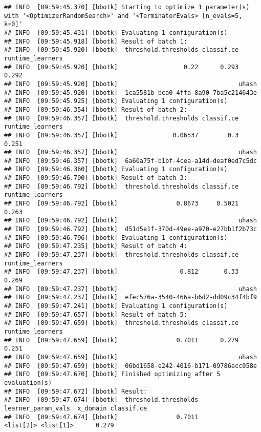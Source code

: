 \documentclass[
]{scrbook}
\begin{document}
\begin{verbatim}
## INFO  [09:59:45.370] [bbotk] Starting to optimize 1 parameter(s) with '<OptimizerRandomSearch>' and '<TerminatorEvals> [n_evals=5, k=0]' 
## INFO  [09:59:45.431] [bbotk] Evaluating 1 configuration(s) 
## INFO  [09:59:45.918] [bbotk] Result of batch 1: 
## INFO  [09:59:45.920] [bbotk]  threshold.thresholds classif.ce runtime_learners 
## INFO  [09:59:45.920] [bbotk]                  0.22      0.293            0.292 
## INFO  [09:59:45.920] [bbotk]                                 uhash 
## INFO  [09:59:45.920] [bbotk]  1ca5581b-bca0-4ffa-8a90-7ba5c214643e 
## INFO  [09:59:45.925] [bbotk] Evaluating 1 configuration(s) 
## INFO  [09:59:46.354] [bbotk] Result of batch 2: 
## INFO  [09:59:46.357] [bbotk]  threshold.thresholds classif.ce runtime_learners 
## INFO  [09:59:46.357] [bbotk]               0.06537        0.3            0.251 
## INFO  [09:59:46.357] [bbotk]                                 uhash 
## INFO  [09:59:46.357] [bbotk]  6a60a75f-b1bf-4cea-a14d-deaf0ed7c5dc 
## INFO  [09:59:46.360] [bbotk] Evaluating 1 configuration(s) 
## INFO  [09:59:46.790] [bbotk] Result of batch 3: 
## INFO  [09:59:46.792] [bbotk]  threshold.thresholds classif.ce runtime_learners 
## INFO  [09:59:46.792] [bbotk]                0.8673     0.5021            0.263 
## INFO  [09:59:46.792] [bbotk]                                 uhash 
## INFO  [09:59:46.792] [bbotk]  d51d5e1f-370d-49ee-a970-e27bb1f2b73c 
## INFO  [09:59:46.796] [bbotk] Evaluating 1 configuration(s) 
## INFO  [09:59:47.235] [bbotk] Result of batch 4: 
## INFO  [09:59:47.237] [bbotk]  threshold.thresholds classif.ce runtime_learners 
## INFO  [09:59:47.237] [bbotk]                 0.812       0.33            0.269 
## INFO  [09:59:47.237] [bbotk]                                 uhash 
## INFO  [09:59:47.237] [bbotk]  efec576a-3540-466a-b6d2-dd09c34f4bf9 
## INFO  [09:59:47.241] [bbotk] Evaluating 1 configuration(s) 
## INFO  [09:59:47.657] [bbotk] Result of batch 5: 
## INFO  [09:59:47.659] [bbotk]  threshold.thresholds classif.ce runtime_learners 
## INFO  [09:59:47.659] [bbotk]                0.7011      0.279            0.251 
## INFO  [09:59:47.659] [bbotk]                                 uhash 
## INFO  [09:59:47.659] [bbotk]  06bd1658-e242-4016-b171-09786acc058e 
## INFO  [09:59:47.670] [bbotk] Finished optimizing after 5 evaluation(s) 
## INFO  [09:59:47.672] [bbotk] Result: 
## INFO  [09:59:47.674] [bbotk]  threshold.thresholds learner_param_vals  x_domain classif.ce 
## INFO  [09:59:47.674] [bbotk]                0.7011          <list[2]> <list[1]>      0.279
\end{verbatim}
\end{document}
